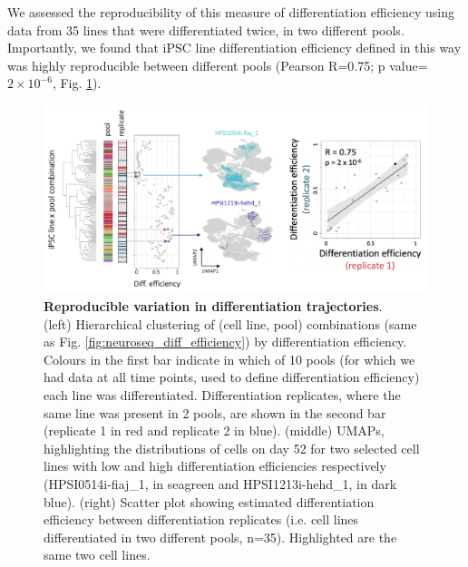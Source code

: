 We assessed the reproducibility of this measure of differentiation efficiency using data from 35 lines that were differentiated twice, in two different pools. 
Importantly, we found that iPSC line differentiation efficiency defined in this way was highly reproducible between different pools (Pearson R=0.75; p value=$2 \times 10^{-6}$, Fig. \ref{fig:neuroseq_diff_eff_replication}).

\begin{figure}[h]
\centering
\includegraphics[width=15.5cm]{Chapter5/Fig/neuroseq_diff_eff_replication.png}
\caption[Reproducible differentiation efficiency]{\textbf{Reproducible variation in differentiation trajectories}.\\
(left) Hierarchical clustering of (cell line, pool) combinations (same as Fig. \ref{fig:neuroseq_diff_efficiency}) by differentiation efficiency. 
Colours in the first bar indicate in which of 10 pools (for which we had data at all time points, used to define differentiation efficiency) each line was differentiated. 
Differentiation replicates, where the same line was present in 2 pools, are shown in the second bar (replicate 1 in red and replicate 2 in blue).
(middle) UMAPs, highlighting the distributions of cells on day 52 for two selected cell lines with low and high differentiation efficiencies respectively (HPSI0514i-fiaj\_1, in seagreen and HPSI1213i-hehd\_1, in dark blue).
(right) Scatter plot showing estimated differentiation efficiency between differentiation replicates (i.e. cell lines differentiated in two different pools, n=35). 
Highlighted are the same two cell lines.}
\label{fig:neuroseq_diff_eff_replication}
\end{figure}


